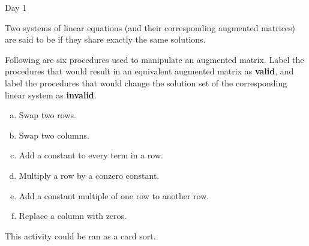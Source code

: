 \begin{applicationActivities}{Day 1}
\begin{definition}
  Two systems of linear equations (and their corresponding augmented
  matrices) are said to be  if they share exactly the
  same solutions.
\end{definition}

\begin{activity}
  Following are six procedures used to manipulate an augmented matrix.
  Label the procedures that would result in an equivalent augmented
  matrix as \textbf{valid}, and label the procedures that would
  change the solution set of the corresponding linear system as
  \textbf{invalid}.
  \begin{multicols}{2}
    \begin{enumerate}[a)]
      \item Swap two rows.
      \item Swap two columns.
      \item Add a constant to every term in a row.
      \item Multiply a row by a conzero constant.
      \item Add a constant multiple of one row to another row.
      \item Replace a column with zeros.
    \end{enumerate}
  \end{multicols}
  \begin{TBLnote}
    This activity could be ran as a card sort.
  \end{TBLnote}
\end{activity}



\end{applicationActivities}
